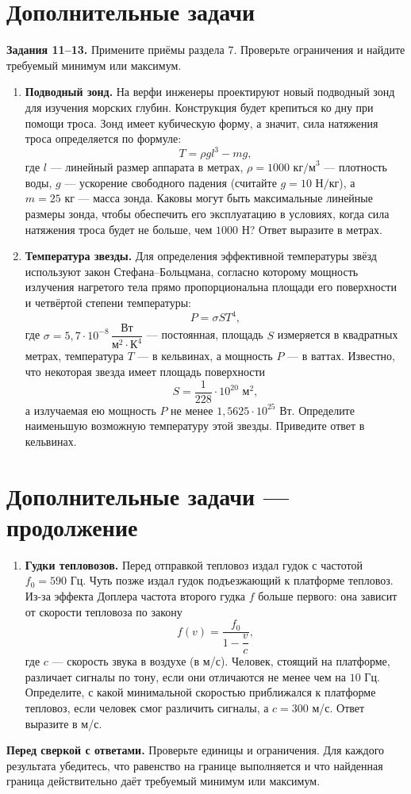\documentclass[a4paper,12pt]{article}
\newcommand{\heading}[1]{\section*{\color{darkaccent}#1}}
\begin{document}
\clearpage
\heading{Дополнительные задачи}
\textbf{Задания 11--13.} Примените приёмы раздела 7. Проверьте ограничения и найдите требуемый минимум или максимум.
\begin{enumerate}[start=11]
\item \textbf{Подводный зонд.} На верфи инженеры проектируют новый подводный зонд для изучения морских глубин. Конструкция будет крепиться ко дну при помощи троса. Зонд имеет кубическую форму, а значит, сила натяжения троса определяется по формуле:
\[
T=\rho g l^3-mg,
\]
где $l$ --- линейный размер аппарата в метрах, $\rho=1000\text{ кг/м}^3$ --- плотность воды, $g$ --- ускорение свободного падения (считайте $g=10\text{ Н/кг}$), а $m=25\text{ кг}$ --- масса зонда. Каковы могут быть максимальные линейные размеры зонда, чтобы обеспечить его эксплуатацию в условиях, когда сила натяжения троса будет не больше, чем $1000$ Н? Ответ выразите в метрах.

\item \textbf{Температура звезды.} Для определения эффективной температуры звёзд используют закон Стефана--Больцмана, согласно которому мощность излучения нагретого тела прямо пропорциональна площади его поверхности и четвёртой степени температуры:
\[
P=\sigma ST^4,
\]
где $\sigma=5,7\cdot10^{-8}\,\dfrac{\text{Вт}}{\text{м}^2\cdot\text{К}^4}$ --- постоянная, площадь $S$ измеряется в квадратных метрах, температура $T$ --- в кельвинах, а мощность $P$ --- в ваттах. Известно, что некоторая звезда имеет площадь поверхности
\[
S=\frac{1}{228}\cdot10^{20}\text{ м}^2,
\]
а излучаемая ею мощность $P$ не менее $1,5625\cdot10^{25}$ Вт. Определите наименьшую возможную температуру этой звезды. Приведите ответ в кельвинах.
\end{enumerate}

\clearpage
\heading{Дополнительные задачи — продолжение}
\begin{enumerate}[start=13]
\item \textbf{Гудки тепловозов.} Перед отправкой тепловоз издал гудок с частотой $f_0=590$ Гц. Чуть позже издал гудок подъезжающий к платформе тепловоз. Из-за эффекта Доплера частота второго гудка $f$ больше первого: она зависит от скорости тепловоза по закону
\[
f(v)=\frac{f_0}{1-\dfrac vc},
\]
где $c$ --- скорость звука в воздухе (в м/с). Человек, стоящий на платформе, различает сигналы по тону, если они отличаются не менее чем на $10$ Гц. Определите, с какой минимальной скоростью приближался к платформе тепловоз, если человек смог различить сигналы, а $c=300$ м/с. Ответ выразите в м/с.
\end{enumerate}
\vfill
\textbf{Перед сверкой с ответами.} Проверьте единицы и ограничения. Для каждого результата убедитесь, что равенство на границе выполняется и что найденная граница действительно даёт требуемый минимум или максимум.
\end{document}
